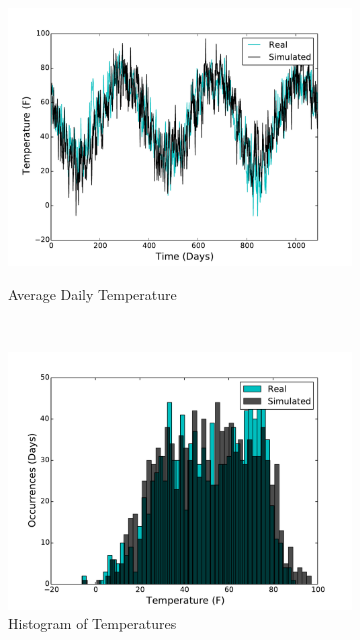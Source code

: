 \documentclass[11pt, letterpaper]{article}
\begin{document}
\begin{figure}[H]
  \centering
  \begin{subfigure}[b]{0.45\textwidth}
    \includegraphics[width=\textwidth]{figures/sim_temp.pdf}
    \label{fig:analysis-raw}
    \caption{Average Daily Temperature}
  \end{subfigure}
  ~
  \begin{subfigure}[b]{0.45\textwidth}
    \includegraphics[width=\textwidth]{figures/sim_temp_hist.pdf}
    \caption{Histogram of Temperatures}
  \end{subfigure}
  ~
  \begin{subfigure}[b]{0.45\textwidth}

\end{subfigure}
\end{figure}
\end{document}
